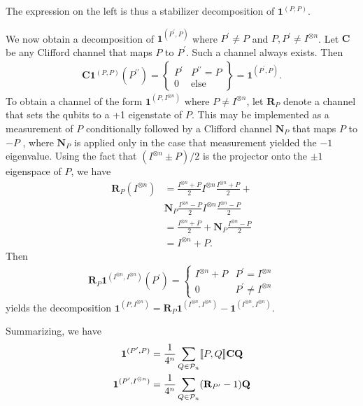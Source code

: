\documentclass[twocolumn,pra]{revtex4}
\newcommand{\bs}[1]{\boldsymbol{#1}}
\begin{document}
The expression on the left is thus a stabilizer decomposition of $\bs{1}^{(P,P)}$.
\par
We now obtain a decomposition of $\bs{1}^{(P^{\prime},P)}$ where $P^{\prime}\ne P$
and $P,P^{\prime}\ne I^{\otimes n}$. Let $\mathbf{C}$ be any Clifford
channel that maps $P$ to $P^{\prime}$. Such a channel always exists. Then
\begin{gather}
\mathbf{C}\mathbf{1}^{(P,P)}(P^{\prime\prime})=\left\{ \begin{array}{ll}
P^{\prime} & P^{\prime\prime}=P\\
0 & \text{else}
\end{array}\right\} =\mathbf{1}^{(P^{\prime},P)}.
\end{gather}
To obtain a channel of the form $\bs{1}^{(P,I^{\otimes n})}$
where $P\ne I^{\otimes n}$, let $\mathbf{R}_{P}$ denote a channel
that sets the qubits to a +1 eigenstate of $P$. This may be implemented
as a measurement of $P$ conditionally followed by a Clifford channel
$\mathbf{N}_{P}$ that maps $P$ to $-P$ , where $\mathbf{N}_{P}$
is applied only in the case that measurement yielded the $-1$ eigenvalue.
Using the fact that $(I^{\otimes n} \pm P)/2$ is the projector onto the  $\pm1$ eigenspace of $P$, we have
\begin{align}
\nonumber
\mathbf{R}_{P}(I^{\otimes n}) & = \frac{I^{\otimes n}+P}{2} I^{\otimes n} \frac{I^{\otimes n}+P}{2} + \\ 
& \mathbf{N}_{P} \frac{I^{\otimes n}-P}{2} I^{\otimes n} \frac{I^{\otimes n}-P}{2} \\
 & =\frac{I^{\otimes n}+P}{2}+\mathbf{N}_{P} \frac{I^{\otimes n}-P}{2}\\
 & = I^{\otimes n}+P.
\end{align}
Then 
\begin{gather}
\mathbf{R}_{P}\mathbf{1}^{(I^{\otimes n},I^{\otimes n})}(P^{\prime})=\begin{cases}
I^{\otimes n} + P & P^{\prime}=I^{\otimes n}\\
0 & P^{\prime}\ne I^{\otimes n}
\end{cases}
\end{gather}
yields the decomposition
$\bs{1}^{(P,I^{\otimes n})}=\mathbf{R}_{P}\mathbf{1}^{(I^{\otimes n},I^{\otimes n})}-\mathbf{1}^{(I^{\otimes n},I^{\otimes n})}$.
\par
Summarizing, we have 
\begin{align}
\bs{1}^{(P^{\prime},P)} & =\frac{1}{4^{n}}\sum_{Q\in\mathcal{P}_{n}}\comsign{P,Q}\mathbf{CQ}\label{eq: unital basic decomposition}\\
\bs{1}^{(P^{\prime},I^{\otimes n})} & =\frac{1}{4^{n}}\sum_{Q\in\mathcal{P}_{n}}(\mathbf{R}_{P^{\prime}}-1)\mathbf{Q}\label{eq: nonunital basic decomposition}
\end{align}
\end{document}
